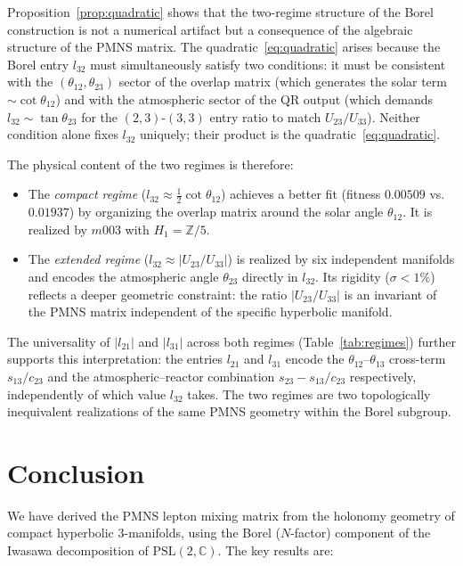 \documentclass[11pt,a4paper]{article}
\newcommand{\PSL}{\mathrm{PSL}(2,\mathbb{C})}
\begin{document}
Proposition~\ref{prop:quadratic} shows that the two-regime structure
of the Borel construction is not a numerical artifact but a
consequence of the algebraic structure of the PMNS matrix.
The quadratic~\eqref{eq:quadratic} arises because the Borel
entry $l_{32}$ must simultaneously satisfy two conditions:
it must be consistent with the $(\theta_{12}, \theta_{23})$ sector
of the overlap matrix (which generates the solar term
$\sim\cot\theta_{12}$) and with the atmospheric sector of the
QR output (which demands $l_{32} \sim \tan\theta_{23}$ for the
$(2,3)$-$(3,3)$ entry ratio to match $U_{23}/U_{33}$).
Neither condition alone fixes $l_{32}$ uniquely; their product is
the quadratic~\eqref{eq:quadratic}.
 
The physical content of the two regimes is therefore:
\begin{itemize}
\item The \emph{compact regime} ($l_{32} \approx \tfrac{1}{2}\cot\theta_{12}$)
achieves a better fit (fitness $0.00509$ vs.\ $0.01937$) by
organizing the overlap matrix around the solar angle $\theta_{12}$.
It is realized by $m003$ with $H_1 = \mathbb{Z}/5$.
\item The \emph{extended regime} ($l_{32} \approx |U_{23}/U_{33}|$)
is realized by six independent manifolds and encodes the atmospheric
angle $\theta_{23}$ directly in $l_{32}$. Its rigidity ($\sigma < 1\%$)
reflects a deeper geometric constraint: the ratio $|U_{23}/U_{33}|$
is an invariant of the PMNS matrix independent of the specific
hyperbolic manifold.
\end{itemize}
 
The universality of $|l_{21}|$ and $|l_{31}|$ across both regimes
(Table~\ref{tab:regimes}) further supports this interpretation:
the entries $l_{21}$ and $l_{31}$ encode the $\theta_{12}$--$\theta_{13}$
cross-term $s_{13}/c_{23}$ and the atmospheric--reactor combination
$s_{23} - s_{13}/c_{23}$ respectively, independently of which
value $l_{32}$ takes.
The two regimes are two topologically inequivalent realizations of
the same PMNS geometry within the Borel subgroup.

\section{Conclusion}
\label{sec:conclusion}

We have derived the PMNS lepton mixing matrix from the holonomy
geometry of compact hyperbolic 3-manifolds, using the Borel
($N$-factor) component of the Iwasawa decomposition of $\PSL$.
The key results are:
\end{document}
